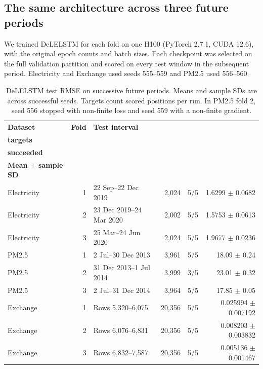 \documentclass[10pt,a4paper]{article}
\begin{document}
\subsection{The same architecture across three future periods}\label{sec:forecasts}
We trained DeLELSTM for each fold on one H100 (PyTorch 2.7.1, CUDA 12.6), with the original epoch counts and batch sizes. Each checkpoint was selected on the full validation partition and scored on every test window in the subsequent period. Electricity and Exchange used seeds 555--559 and PM2.5 used 556--560.

\begin{table}[H]
\centering
\caption{DeLELSTM test RMSE on successive future periods. Means and sample SDs are across successful seeds. Targets count scored positions per run. In PM2.5 fold 2, seed 556 stopped with non-finite loss and seed 559 with a non-finite gradient.}\label{tab:3}
\small
\begin{tabular}{@{}lrlrrr@{}}
\toprule
\textbf{Dataset} & \textbf{Fold} & \textbf{Test interval} & \shortstack[r]{\textbf{Scored}\\\textbf{targets}} & \shortstack[r]{\textbf{Seeds}\\\textbf{succeeded}} & \shortstack[r]{\textbf{Test RMSE}\\\textbf{Mean \(\pm\) sample SD}} \\
\midrule
Electricity & 1 & 22 Sep--22 Dec 2019 & 2,024 & 5/5 & 1.6299 \(\pm\) 0.0682 \\
Electricity & 2 & 23 Dec 2019--24 Mar 2020 & 2,002 & 5/5 & 1.5753 \(\pm\) 0.0613 \\
Electricity & 3 & 25 Mar--24 Jun 2020 & 2,024 & 5/5 & 1.9677 \(\pm\) 0.0236 \\
PM2.5 & 1 & 2 Jul--30 Dec 2013 & 3,961 & 5/5 & 18.09 \(\pm\) 0.24 \\
PM2.5 & 2 & 31 Dec 2013--1 Jul 2014 & 3,999 & 3/5 & 23.01 \(\pm\) 0.32 \\
PM2.5 & 3 & 2 Jul--31 Dec 2014 & 3,964 & 5/5 & 17.85 \(\pm\) 0.05 \\
Exchange & 1 & Rows 5,320--6,075 & 20,356 & 5/5 & 0.025994 \(\pm\) 0.007192 \\
Exchange & 2 & Rows 6,076--6,831 & 20,356 & 5/5 & 0.008203 \(\pm\) 0.003832 \\
Exchange & 3 & Rows 6,832--7,587 & 20,356 & 5/5 & 0.005136 \(\pm\) 0.001467 \\
\bottomrule
\end{tabular}
\end{table}
\end{document}
